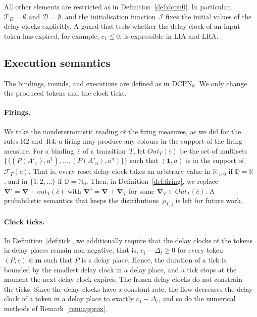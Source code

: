\documentclass[11pt]{article}
\theoremstyle{definition}
\newcommand{\NatZero}{\mathbb{N}_0}
\newcommand{\Real}{\mathbb{R}}
\newcommand{\Dom}{\mathbb{D}}
\newcommand{\mset}[1]{\{\!\{#1\}\!\}}
\newcommand{\cvec}{\overline{c}}
\newcommand{\bfm}{\mathbf{m}}
\newcommand{\bfNabla}{\boldsymbol{\nabla}}
\newcommand{\DCPN}[1]{\texorpdfstring{\textup{DCPN}\ensuremath{_{#1}}}{DCPN#1}}
\begin{document}
All other elements are restricted as in Definition~\ref{def:dcpn0}. In
particular, $\mathcal{T}_D = \emptyset$ and $\mathcal{D} = \emptyset$, and the
initialisation function~$\mathcal{I}$ fixes the initial values of the delay
clocks explicitly. A guard that tests whether the delay clock of an input
token has expired, for example, $c_1 \le 0$, is expressible in LIA and LRA.

\subsection{Execution semantics}

The bindings, rounds, and executions are defined as in \DCPN{0}. We only
change the produced tokens and the clock ticks.

\paragraph{Firings.}
We take the nondeterministic reading of the firing measures, as we did for the
rules R2 and~R4: a firing may produce any colours in the support of the firing
measure. For a binding~$\cvec$ of a transition~$T$, let $\mathit{Out}_T(\cvec)$
be the set of multisets $\mset{(P(A'_1), a^1), \dots, (P(A'_n), a^n)}$ such
that $(\mathbf{1}, a)$ is in the support of~$\mathcal{F}_T(\cvec)$. That is,
every reset delay clock takes an arbitrary value in $\Real_{> 0}$ if
$\Dom = \Real$, and in $\{1, 2, \dots\}$ if $\Dom = \NatZero$. Then, in
Definition~\ref{def:firing}, we replace
$\bfNabla' = \bfNabla + \mathit{out}_T(\cvec)$ with
$\bfNabla' = \bfNabla + \bfNabla_T$ for some
$\bfNabla_T \in \mathit{Out}_T(\cvec)$. A probabilistic semantics that keeps
the distributions~$\rho_{T, j}$ is left for future work.

\paragraph{Clock ticks.}
In Definition~\ref{def:tick}, we additionally require that the delay clocks
of the tokens in delay places remain non-negative, that is, $c_1 - \Delta_t \ge 0$
for every token $(P, c) \in \bfm$ such that $P$ is a delay place. Hence, the
duration of a tick is bounded by the smallest delay clock in a delay place,
and a tick stops at the moment the next delay clock expires. The frozen delay
clocks do not constrain the ticks. Since the delay clocks have a constant
rate, the flow decreases the delay clock of a token in a delay place to
exactly $c_1 - \Delta_t$, and so do the numerical methods of
Remark~\ref{rem:approx}.
\end{document}

